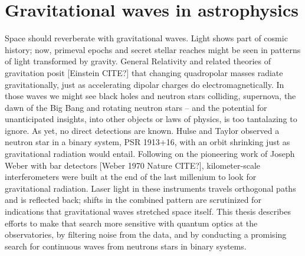 


    \section{Gravitational waves in astrophysics}
    \label{grav_waves_astro}

        Space should reverberate with gravitational waves. 
Light shows part of cosmic history; now, primeval epochs and secret stellar reaches might be seen in patterns of light transformed by gravity. 
General Relativity and related theories of gravitation posit [Einstein CITE?] that changing quadropolar masses radiate gravitationally, just as accelerating dipolar charges do electromagnetically. 
In those waves we might see black holes and neutron stars colliding, supernova, the dawn of the Big Bang and rotating neutron stars -- and the potential for unanticipated insights, into other objects or laws of physics, is too tantalazing to ignore. 
As yet, no direct detections are known. 
Hulse and Taylor \cite{HulseTaylor1975} observed a neutron star in a binary system, PSR 1913+16, with an orbit shrinking just as gravitational radiation would entail. 
Following on the pioneering work of Joseph Weber with bar detectors [Weber 1970 Nature CITE?], kilometer-scale interferometers were built at the end of the last millenium to look for gravitational radiation. 
Laser light in these instruments travels orthogonal paths and is reflected back; shifts in the combined pattern are scrutinized for indications that gravitational waves stretched space itself. 
This thesis describes efforts to make that search more sensitive with quantum optics at the observatories, by filtering noise from the data, and by conducting a promising search for continuous waves from neutrons stars in binary systems.

